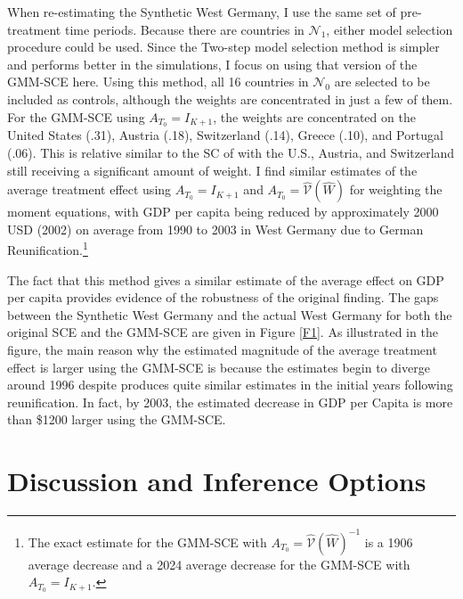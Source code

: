 \documentclass{article}
\begin{document}
\par
When re-estimating the Synthetic West Germany, I use the same set of pre-treatment time periods. Because there are countries in $\mathcal{N}_1$, either model selection procedure could be used. Since the Two-step model selection method is simpler and performs better in the simulations, I focus on using that version of the GMM-SCE here. Using this method, all 16 countries in $\mathcal{N}_0$ are selected to be included as controls, although the weights are concentrated in just a few of them. For the GMM-SCE using $A_{T_0} = I_{K+1}$, the weights are concentrated on the United States (.31), Austria (.18), Switzerland (.14), Greece (.10), and Portugal (.06). This is relative similar to the SC of \cite{Abadie2015} with the U.S., Austria, and Switzerland still receiving a significant amount of weight. I find similar estimates of the average treatment effect using $A_{T_0} = I_{K+1}$ and $A_{T_0} = \hat{\mathcal{V}}(\hat{W})$ for weighting the moment equations, with GDP per capita being reduced by approximately 2000 USD (2002) on average from 1990 to 2003 in West Germany due to German Reunification.\footnote{The exact estimate for the GMM-SCE with $A_{T_0} = \hat{\mathcal{V}}(\hat{W})^{-1}$ is a 1906 average decrease and a 2024 average decrease for the GMM-SCE with $A_{T_0} = I_{K+1}$.}
\par 
The fact that this method gives a similar estimate of the average effect on GDP per capita provides evidence of the robustness of the original finding. The gaps between the Synthetic West Germany and the actual West Germany for both the original SCE and the GMM-SCE are given in Figure \ref{F1}. As illustrated in the figure, the main reason why the estimated magnitude of the average treatment effect is larger using the GMM-SCE is because the estimates begin to diverge around 1996 despite produces quite similar estimates in the initial years following reunification. In fact, by 2003, the estimated decrease in GDP per Capita is more than \$1200 larger using the GMM-SCE.


\section{Discussion and Inference Options} \label{Discussion}
\end{document}
